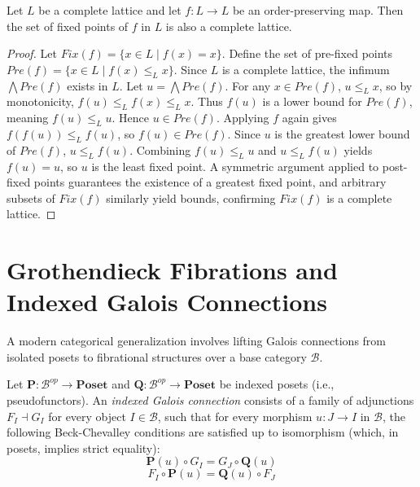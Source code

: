 \begin{theorem}
Let $L$ be a complete lattice and let $f: L \to L$ be an order-preserving map. Then the set of fixed points of $f$ in $L$ is also a complete lattice.
\end{theorem}
\begin{proof}
Let $Fix(f) = \{x \in L \mid f(x) = x\}$. Define the set of pre-fixed points $Pre(f) = \{x \in L \mid f(x) \leq_L x\}$.
Since $L$ is a complete lattice, the infimum $\bigwedge Pre(f)$ exists in $L$. Let $u = \bigwedge Pre(f)$.
For any $x \in Pre(f)$, $u \leq_L x$, so by monotonicity, $f(u) \leq_L f(x) \leq_L x$. Thus $f(u)$ is a lower bound for $Pre(f)$, meaning $f(u) \leq_L u$.
Hence $u \in Pre(f)$. Applying $f$ again gives $f(f(u)) \leq_L f(u)$, so $f(u) \in Pre(f)$.
Since $u$ is the greatest lower bound of $Pre(f)$, $u \leq_L f(u)$.
Combining $f(u) \leq_L u$ and $u \leq_L f(u)$ yields $f(u) = u$, so $u$ is the least fixed point.
A symmetric argument applied to post-fixed points guarantees the existence of a greatest fixed point, and arbitrary subsets of $Fix(f)$ similarly yield bounds, confirming $Fix(f)$ is a complete lattice.
\end{proof}

\section{Grothendieck Fibrations and Indexed Galois Connections}
A modern categorical generalization involves lifting Galois connections from isolated posets to fibrational structures over a base category $\mathcal{B}$.

\begin{definition}
Let $\mathbf{P}: \mathcal{B}^{op} \to \mathbf{Poset}$ and $\mathbf{Q}: \mathcal{B}^{op} \to \mathbf{Poset}$ be indexed posets (i.e., pseudofunctors). An \emph{indexed Galois connection} consists of a family of adjunctions $F_I \dashv G_I$ for every object $I \in \mathcal{B}$, such that for every morphism $u: J \to I$ in $\mathcal{B}$, the following Beck-Chevalley conditions are satisfied up to isomorphism (which, in posets, implies strict equality):
\[ \mathbf{P}(u) \circ G_I = G_J \circ \mathbf{Q}(u) \]
\[ F_I \circ \mathbf{P}(u) = \mathbf{Q}(u) \circ F_J \]
\end{definition}

